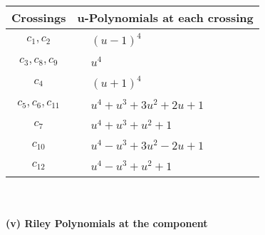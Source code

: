 \documentclass[1p]{elsarticle_modified}
\theoremstyle{definition}
\begin{document}
\begin{tabular}{m{50pt}|m{274pt}}
Crossings & \hspace{64pt}u-Polynomials at each crossing \\
\hline $$\begin{aligned}c_{1},c_{2}\end{aligned}$$&$\begin{aligned}
&(u-1)^4
\end{aligned}$\\
\hline $$\begin{aligned}c_{3},c_{8},c_{9}\end{aligned}$$&$\begin{aligned}
&u^4
\end{aligned}$\\
\hline $$\begin{aligned}c_{4}\end{aligned}$$&$\begin{aligned}
&(u+1)^4
\end{aligned}$\\
\hline $$\begin{aligned}c_{5},c_{6},c_{11}\end{aligned}$$&$\begin{aligned}
&u^4+u^3+3 u^2+2 u+1
\end{aligned}$\\
\hline $$\begin{aligned}c_{7}\end{aligned}$$&$\begin{aligned}
&u^4+u^3+u^2+1
\end{aligned}$\\
\hline $$\begin{aligned}c_{10}\end{aligned}$$&$\begin{aligned}
&u^4- u^3+3 u^2-2 u+1
\end{aligned}$\\
\hline $$\begin{aligned}c_{12}\end{aligned}$$&$\begin{aligned}
&u^4- u^3+u^2+1
\end{aligned}$\\
\hline
\end{tabular}\\~\\
\newpage\renewcommand{\arraystretch}{1}
\flushleft \textbf{(v) Riley Polynomials at the component}\newline \\
\end{document}
